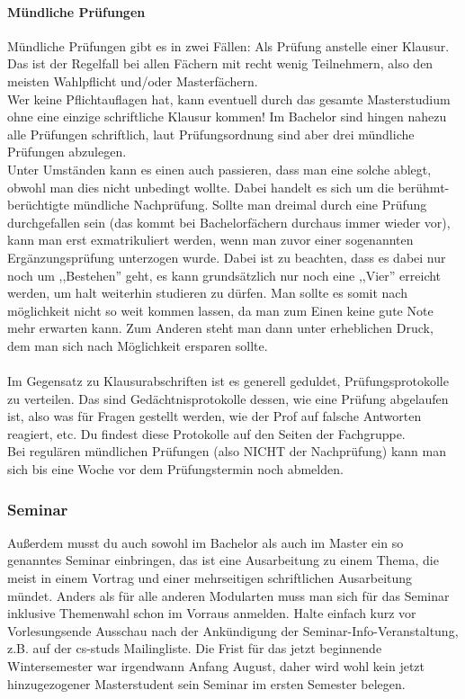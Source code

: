 \paragraph*{Mündliche Prüfungen}
Mündliche Prüfungen gibt es in zwei Fällen: Als Prüfung anstelle einer
Klausur. Das ist der Regelfall bei allen Fächern mit recht wenig
Teilnehmern, also den meisten Wahlpflicht und/oder Masterfächern. \\ 
 Wer keine Pflichtauflagen hat, kann eventuell durch das gesamte
 Masterstudium ohne eine einzige schriftliche Klausur kommen! 
Im Bachelor sind hingen nahezu alle Prüfungen schriftlich, laut
 Prüfungsordnung sind aber drei mündliche Prüfungen abzulegen. \\
Unter Umständen kann es einen auch passieren, dass man eine solche
ablegt, obwohl man dies nicht unbedingt wollte. Dabei handelt es sich
um die berühmt-berüchtigte mündliche Nachprüfung. Sollte man dreimal
durch eine Prüfung durchgefallen sein (das kommt bei Bachelorfächern
durchaus immer wieder vor), kann man erst exmatrikuliert werden, wenn
man zuvor einer sogenannten Ergänzungsprüfung unterzogen wurde. Dabei
ist zu beachten, dass es dabei nur noch um ,,Bestehen'' geht, es kann
grundsätzlich nur noch eine ,,Vier''  erreicht werden, um halt
weiterhin studieren zu dürfen. Man sollte es somit nach möglichkeit
nicht so weit kommen lassen, da man zum Einen keine gute Note mehr
erwarten kann. Zum Anderen steht man dann unter erheblichen Druck, dem
man sich nach Möglichkeit ersparen sollte.\\\\
Im Gegensatz zu Klausurabschriften ist es generell geduldet,
Prüfungsprotokolle zu verteilen. Das sind Gedächtnisprotokolle dessen,
wie eine Prüfung abgelaufen ist, also was für Fragen gestellt werden,
wie der Prof auf falsche Antworten reagiert, etc. Du findest diese
Protokolle auf den Seiten der Fachgruppe.\\
Bei regulären mündlichen Prüfungen (also NICHT der Nachprüfung) kann
man sich bis eine Woche vor dem Prüfungstermin noch abmelden.
\subsubsection{Seminar}
Außerdem musst du auch sowohl im Bachelor als auch im Master ein so genanntes Seminar einbringen, das ist eine Ausarbeitung zu einem Thema, die meist in einem Vortrag und einer mehrseitigen schriftlichen Ausarbeitung mündet. Anders als für alle anderen Modularten muss man sich für das Seminar inklusive Themenwahl schon im Vorraus anmelden. Halte einfach kurz vor Vorlesungsende Ausschau nach der Ankündigung der Seminar-Info-Veranstaltung, z.B. auf der cs-studs Mailingliste. Die Frist für das jetzt beginnende Wintersemester war irgendwann Anfang August, daher wird wohl kein jetzt hinzugezogener Masterstudent sein Seminar im ersten Semester belegen.

